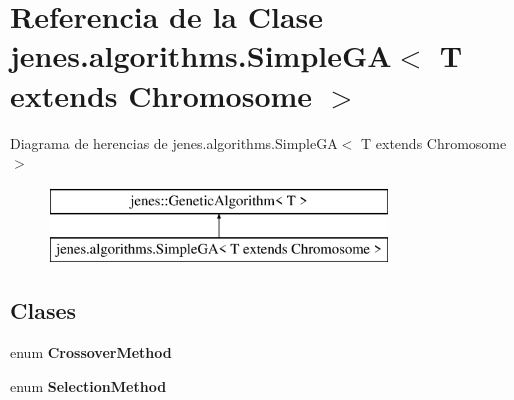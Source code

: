 \hypertarget{classjenes_1_1algorithms_1_1_simple_g_a_3_01_t_01extends_01_chromosome_01_4}{\section{Referencia de la Clase jenes.\-algorithms.\-Simple\-G\-A$<$ T extends Chromosome $>$}
\label{classjenes_1_1algorithms_1_1_simple_g_a_3_01_t_01extends_01_chromosome_01_4}
}
Diagrama de herencias de jenes.\-algorithms.\-Simple\-G\-A$<$ T extends Chromosome $>$\begin{figure}[H]
\begin{center}
\leavevmode
\includegraphics[height=2.000000cm]{classjenes_1_1algorithms_1_1_simple_g_a_3_01_t_01extends_01_chromosome_01_4}
\end{center}
\end{figure}
\subsection*{Clases}
\begin{DoxyCompactItemize}
\item 
enum {\bfseries Crossover\-Method}
\item 
enum {\bfseries Selection\-Method}
\end{DoxyCompactItemize}
